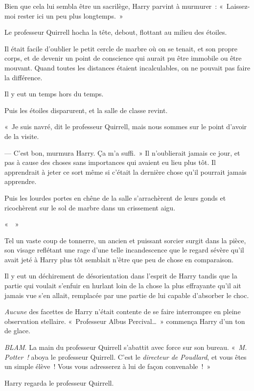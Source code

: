 Bien que cela lui sembla être un sacrilège, Harry parvint à murmurer~: «~Laissez-moi rester ici un peu plus longtemps.~»

Le professeur Quirrell hocha la tête, debout, flottant au milieu des étoiles.

Il était facile d'oublier le petit cercle de marbre où on se tenait, et son propre corps, et de devenir un point de conscience qui aurait pu être immobile ou être mouvant.
Quand toutes les distances étaient incalculables, on ne pouvait pas faire la différence.

Il y eut un temps hors du temps.

Puis les étoiles disparurent, et la salle de classe revint.

«~Je suis navré, dit le professeur Quirrell, mais nous sommes sur le point d'avoir de la visite.

--- C'est bon, murmura Harry.
Ça m'a suffi.~»
Il n'oublierait jamais ce jour, et pas à cause des choses sans importances qui avaient eu lieu plus tôt.
Il apprendrait à jeter ce sort même si c'était la dernière chose qu'il pourrait jamais apprendre.

Puis les lourdes portes en chêne de la salle s'arrachèrent de leurs gonds et ricochèrent sur le sol de marbre dans un crissement aigu.

«~~»

Tel un vaste coup de tonnerre, un ancien et puissant sorcier surgit dans la pièce, son visage reflétant une rage d'une telle incandescence que le regard sévère qu'il avait jeté à Harry plus tôt semblait n'être que peu de chose en comparaison.

Il y eut un déchirement de désorientation dans l'esprit de Harry tandis que la partie qui voulait s'enfuir en hurlant loin de la chose la plus effrayante qu'il ait jamais vue s'en allait, remplacée par une partie de lui capable d'absorber le choc.

\emph{Aucune} des facettes de Harry n'était contente de se faire interrompre en pleine observation stellaire.
«~Professeur Albus Percival…~»
commença Harry d'un ton de glace.

\emph{BLAM}.
La main du professeur Quirrell s'abattit avec force sur son bureau.
«~\emph{M. Potter~!} aboya le professeur Quirrell.
C'est le \emph{directeur de Poudlard}, et vous êtes un simple élève~!
Vous vous adresserez à lui de façon convenable~!~»

Harry regarda le professeur Quirrell.

